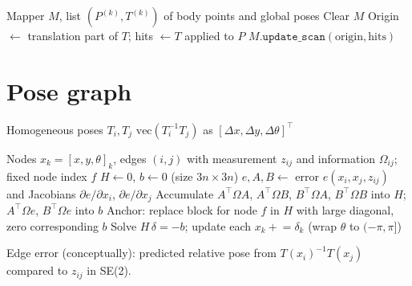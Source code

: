 \documentclass[11pt,a4paper]{article}
\begin{document}
\begin{algorithm}
\caption{Replay map from pose history (\texttt{\_rebuild\_map})}
\begin{algorithmic}[1]
\Require Mapper $M$, list $(P^{(k)}, T^{(k)})$ of body points and global poses
\State Clear $M$
    \State Origin $\gets$ translation part of $T$; hits $\gets T$ applied to $P$
    \State $M.\texttt{update\_scan}(\text{origin}, \text{hits})$
\EndFor
\end{algorithmic}
\end{algorithm}

\section{Pose graph}

\begin{algorithm}
\caption{Relative pose measurement between nodes (\texttt{relative\_transform\_vec})}
\begin{algorithmic}[1]
\Require Homogeneous poses $T_i, T_j$
\State \Return $\mathrm{vec}(T_i^{-1} T_j)$ as $[\Delta x, \Delta y, \Delta\theta]^\top$
\end{algorithmic}
\end{algorithm}

\begin{algorithm}
\caption{Gauss--Newton pose-graph optimisation (\texttt{PoseGraph2D.optimize})}
\begin{algorithmic}[1]
\Require Nodes $x_k = [x,y,\theta]_k$, edges $(i,j)$ with measurement $z_{ij}$ and information $\Omega_{ij}$; fixed node index $f$
    \State $H \gets 0$, $b \gets 0$ (size $3n \times 3n$)
        \State $e, A, B \gets$ error $e(x_i,x_j,z_{ij})$ and Jacobians $\partial e/\partial x_i$, $\partial e/\partial x_j$
        \State Accumulate $A^\top \Omega A$, $A^\top \Omega B$, $B^\top \Omega A$, $B^\top \Omega B$ into $H$; $A^\top \Omega e$, $B^\top \Omega e$ into $b$
    \EndFor
    \State Anchor: replace block for node $f$ in $H$ with large diagonal, zero corresponding $b$
    \State Solve $H\,\delta = -b$; update each $x_k \mathrel{+}= \delta_k$ (wrap $\theta$ to $(-\pi,\pi]$)
\EndFor
\end{algorithmic}
\end{algorithm}

\noindent Edge error (conceptually): predicted relative pose from $T(x_i)^{-1} T(x_j)$ compared to $z_{ij}$ in SE(2).
\end{document}
